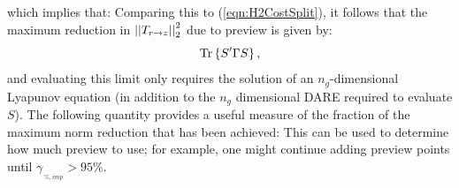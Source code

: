 which implies that:
Comparing this to (\ref{eqn:H2CostSplit}), it follows that the maximum reduction in $\left|\left| T_{r\rightarrow z} \right|\right|_2^2$ due to preview is given by: 
\[
\textrm{Tr}\left\{ S'\Gamma S \right\},
\]
and evaluating this limit only requires the solution of an $n_g$-dimensional Lyapunov equation (in addition to the $n_g$ dimensional DARE required to evaluate $S$). The following quantity provides a useful measure of the fraction of the maximum norm reduction that has been achieved:
This can be used to determine how much preview to use; for example, one might continue adding preview points until $\gamma_{\,_{\%,imp}} >95 \%$.
